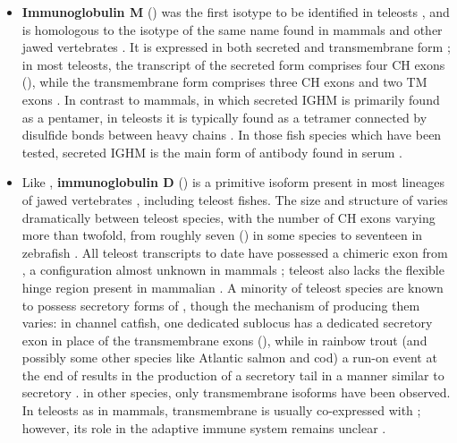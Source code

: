 \begin{itemize}
\item \textbf{Immunoglobulin M} () was the first \igh{} isotype to be identified in teleosts \parencite{fillatreau2013astonishing}, and is homologous to the isotype of the same name found in mammals and other jawed vertebrates \parencite{mashoof2016immunoglobulins}. It is expressed in both secreted and transmembrane form \parencite{fillatreau2013astonishing}; in most teleosts, the transcript of the secreted form comprises four CH exons (), while the transmembrane form comprises three CH exons and two TM exons \parencite{bengten2015fishantibodies,fillatreau2013astonishing}. In contrast to mammals, in which secreted IGHM is primarily found as a pentamer, in teleosts it is typically found as a tetramer \parencite{fillatreau2013astonishing} connected by disulfide bonds between heavy chains \parencite{mashoof2016immunoglobulins}. In those fish species which have been tested, secreted IGHM is the main form of antibody found in serum \parencite{bengten2015fishantibodies,mashoof2016immunoglobulins,fillatreau2013astonishing}.

\item Like , \textbf{immunoglobulin D} () is a primitive isoform present in most lineages of jawed vertebrates \parencite{mashoof2016immunoglobulins}, including teleost fishes. The size and structure of  varies dramatically between teleost species, with the number of CH exons varying more than twofold, from roughly seven () in some species to seventeen in zebrafish \parencite{mashoof2016immunoglobulins,fillatreau2013astonishing}. All teleost  transcripts to date have possessed a chimeric  exon from , a configuration almost unknown in mammals \parencite{mashoof2016immunoglobulins,fillatreau2013astonishing}; teleost  also lacks the flexible hinge region present in mammalian  \parencite{fillatreau2013astonishing}. A minority of teleost species are known to possess secretory forms of , though the mechanism of producing them varies: in channel catfish, one dedicated sublocus has a dedicated  secretory exon in place of the transmembrane exons \parencite{bengten2006catfish} (), while in rainbow trout (and possibly some other species like Atlantic salmon and cod) a run-on event at the end of  results in the production of a secretory tail in a manner similar to secretory  \parencite{ramirezgomez2012secretoryigd}. in other species, only transmembrane isoforms have been observed. In teleosts as in mammals, transmembrane  is usually co-expressed with ; however, its role in the adaptive immune system remains unclear \parencite{mashoof2016immunoglobulins}. %


\end{itemize}
